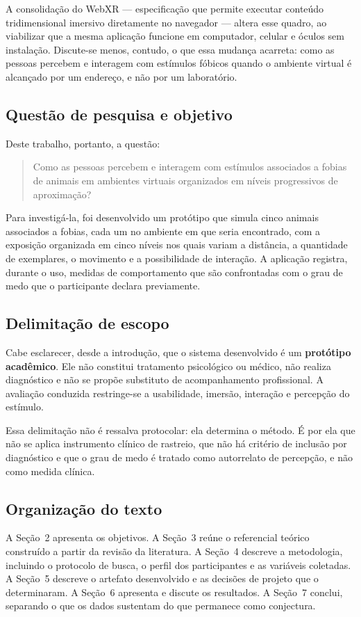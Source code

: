 A consolidação do WebXR --- especificação que permite executar conteúdo
tridimensional imersivo diretamente no navegador --- altera esse quadro,
ao viabilizar que a mesma aplicação funcione em computador, celular e
óculos sem instalação. Discute-se menos, contudo, o que essa mudança
acarreta: como as pessoas percebem e interagem com estímulos fóbicos
quando o ambiente virtual é alcançado por um endereço, e não por um
laboratório.

\subsection*{Questão de pesquisa e objetivo}

Deste trabalho, portanto, a questão:

\begin{quote}
Como as pessoas percebem e interagem com estímulos associados a fobias de
animais em ambientes virtuais organizados em níveis progressivos de
aproximação?
\end{quote}

Para investigá-la, foi desenvolvido um protótipo que simula cinco animais
associados a fobias, cada um no ambiente em que seria encontrado, com a
exposição organizada em cinco níveis nos quais variam a distância, a
quantidade de exemplares, o movimento e a possibilidade de interação. A
aplicação registra, durante o uso, medidas de comportamento que são
confrontadas com o grau de medo que o participante declara previamente.

\subsection*{Delimitação de escopo}

Cabe esclarecer, desde a introdução, que o sistema desenvolvido é um
\textbf{protótipo acadêmico}. Ele não constitui tratamento psicológico ou
médico, não realiza diagnóstico e não se propõe substituto de
acompanhamento profissional. A avaliação conduzida restringe-se a
usabilidade, imersão, interação e percepção do estímulo.

Essa delimitação não é ressalva protocolar: ela determina o método. É por
ela que não se aplica instrumento clínico de rastreio, que não há
critério de inclusão por diagnóstico e que o grau de medo é tratado como
autorrelato de percepção, e não como medida clínica.

\subsection*{Organização do texto}

A Seção~2 apresenta os objetivos. A Seção~3 reúne o referencial teórico
construído a partir da revisão da literatura. A Seção~4 descreve a
metodologia, incluindo o protocolo de busca, o perfil dos participantes e
as variáveis coletadas. A Seção~5 descreve o artefato desenvolvido e as
decisões de projeto que o determinaram. A Seção~6 apresenta e discute os
resultados. A Seção~7 conclui, separando o que os dados sustentam do que
permanece como conjectura.

